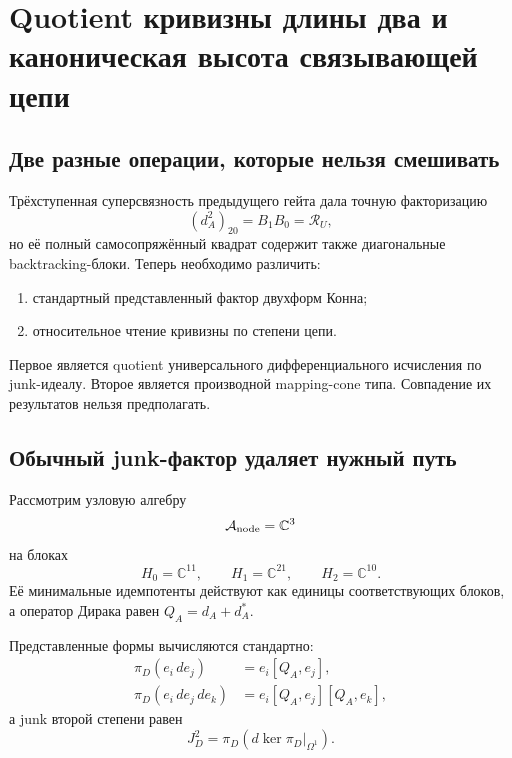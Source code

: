 \chapter{Quotient кривизны длины два и каноническая высота связывающей цепи}
\label{ch:v7-linking-chain-degree-two-curvature-quotient-gate}

\section{Две разные операции, которые нельзя смешивать}

Трёхступенная суперсвязность предыдущего гейта дала точную факторизацию
\begin{equation}
 (d_A^2)_{20}=B_1B_0=\mathcal R_U,
 \label{eq:v7-degree-two-endpoint-block}
\end{equation}
но её полный самосопряжённый квадрат содержит также диагональные
backtracking-блоки. Теперь необходимо различить:
\begin{enumerate}
 \item стандартный представленный фактор двухформ Конна;
 \item относительное чтение кривизны по степени цепи.
\end{enumerate}
Первое является quotient универсального дифференциального исчисления по
junk-идеалу. Второе является производной mapping-cone типа. Совпадение их
результатов нельзя предполагать.

\section{Обычный junk-фактор удаляет нужный путь}

Рассмотрим узловую алгебру
\begin{equation}
 \mathcal A_{\rm node}=\mathbb C^3
 \label{eq:v7-degree-two-node-algebra}
\end{equation}
на блоках
\begin{equation}
 H_0=\mathbb C^{11},\qquad
 H_1=\mathbb C^{21},\qquad
 H_2=\mathbb C^{10}.
 \label{eq:v7-degree-two-node-blocks}
\end{equation}
Её минимальные идемпотенты действуют как единицы соответствующих блоков, а
оператор Дирака равен $Q_A=d_A+d_A^*$.

Представленные формы вычисляются стандартно:
\begin{align}
 \pi_D(e_i\,de_j)&=e_i[Q_A,e_j],\nonumber\\
 \pi_D(e_i\,de_j\,de_k)&=e_i[Q_A,e_j][Q_A,e_k],
 \label{eq:v7-degree-two-represented-forms}
\end{align}
а junk второй степени равен
\begin{equation}
 J_D^2=\pi_D\!\left(d\ker\pi_D|_{\Omega^1}\right).
 \label{eq:v7-degree-two-junk}
\end{equation}

